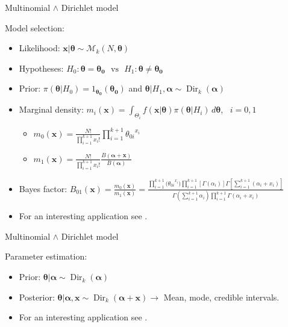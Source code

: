 \begin{frame}{Multinomial $\land$ Dirichlet model}

Model selection:

\begin{itemize}

\item Likelihood: $\bm{x}|\bm{\theta} \sim \mathcal{M}_k(N,\bm{\theta})$

\item Hypotheses:  $ H_0: \bm{\theta}=\bm{\theta_0} \,\,\,\, \text{vs} \,\,\,\,  H_1: \bm{\theta} \neq \bm{\theta_0}$

\item Prior: $\pi(\bm{\theta}|H_0)={1_{\bm{\theta_0}}(\bm{\theta_0})}$ and $\bm{\theta}|H_1, \bm{\alpha} \sim \operatorname{Dir}_k(\bm{\alpha})$ 

\item Marginal density: $m_i(\bm{x})=\int_{\Theta_i} f(\bm{x}|\bm{\theta})\pi(\bm{\theta}|H_i) \, d\bm{\theta} $, \, $i=0,1$

\begin{itemize}

\item  $m_0(\bm{x})=\frac{N!}{\prod_{i=1}^{k+1}x_i!}\prod_{i=1}^{k+1}{\theta_{0i}}^{x_i}$ 
\item  $m_1(\bm{x})= \frac{N!}{\prod_{i=1}^{k+1}x_i!}\frac{B(\bm{\alpha}+\bm{x})}{B(\bm{\alpha})}$ 

\end{itemize}

\item Bayes factor: $B_{01}(\bm{x}) = \frac{m_0(\bm{x})}{m_1(\bm{x})} = \frac{\prod_{i=1}^{k+1}{(\theta_{0i}}^{x_i}) \prod_{i=1}^{k+1}[\Gamma(\alpha_i)] \Gamma [\sum_{i=1}^{k+1}(\alpha_i+x_i)]}{\Gamma(\sum_{i=1}^{k+1} \alpha_i) \prod_{i=1}^{k+1}\Gamma(\alpha_i+x_i)}$

\item For an interesting application see \citet{pericchiTorres2011}.

\end{itemize}

\end{frame}


\begin{frame}{Multinomial $\land$ Dirichlet model}

Parameter estimation:

\begin{itemize}

\item Prior: $\bm{\theta}|\bm{\alpha} \sim \operatorname{Dir}_k(\bm{\alpha})$

\item Posterior: $\bm{\theta} | \bm{\alpha}, \bm{x} \sim \operatorname{Dir}_k(\bm{\alpha} + \bm{x}) \rightarrow$ Mean, mode, credible intervals.

\item For an interesting application see \citet{ley1996peculiar}.


\end{itemize}

\end{frame}

